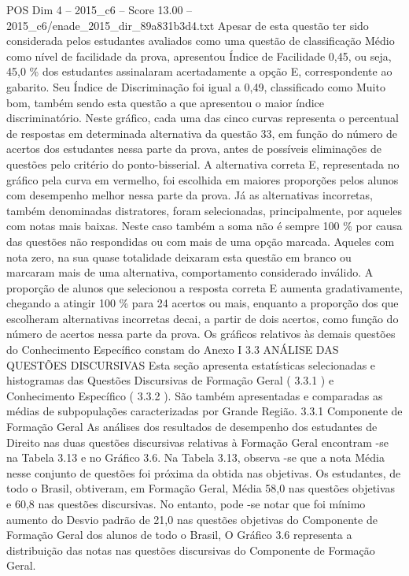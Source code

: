 \begin{textsample}{POS Dim 4 – 2015\_c6 – Score 13.00 – 2015\_c6/enade\_2015\_dir\_89a831b3d4.txt}
Apesar de esta questão ter sido considerada pelos estudantes avaliados como uma questão de classificação Médio como nível de facilidade da prova, apresentou Índice de Facilidade 0,45, ou seja, 45,0 \% dos estudantes assinalaram acertadamente a opção E, correspondente ao gabarito.
Seu Índice de Discriminação foi igual a 0,49, classificado como Muito bom, também sendo esta questão a que apresentou o maior índice discriminatório.
Neste gráfico, cada uma das cinco curvas representa o percentual de respostas em determinada alternativa da questão 33, em função do número de acertos dos estudantes nessa parte da prova, antes de possíveis eliminações de questões pelo critério do ponto-bisserial.
A alternativa correta E, representada no gráfico pela curva em vermelho, foi escolhida em maiores proporções pelos alunos com desempenho melhor nessa parte da prova.
Já as alternativas incorretas, também denominadas distratores, foram selecionadas, principalmente, por aqueles com notas mais baixas.
Neste caso também a soma não é sempre 100 \% por causa das questões não respondidas ou com mais de uma opção marcada.
Aqueles com nota zero, na sua quase totalidade deixaram esta questão em branco ou marcaram mais de uma alternativa, comportamento considerado inválido.
A proporção de alunos que selecionou a resposta correta E aumenta gradativamente, chegando a atingir 100 \% para 24 acertos ou mais, enquanto a proporção dos que escolheram alternativas incorretas decai, a partir de dois acertos, como função do número de acertos nessa parte da prova.
Os gráficos relativos às demais questões do Conhecimento Específico constam do Anexo I 3.3 ANÁLISE DAS QUESTÕES DISCURSIVAS Esta seção apresenta estatísticas selecionadas e histogramas das Questões Discursivas de Formação Geral ( 3.3.1 ) e Conhecimento Específico ( 3.3.2 ).
São também apresentadas e comparadas as médias de subpopulações caracterizadas por Grande Região. 3.3.1 Componente de Formação Geral As análises dos resultados de desempenho dos estudantes de Direito nas duas questões discursivas relativas à Formação Geral encontram -se na Tabela 3.13 e no Gráfico 3.6.
Na Tabela 3.13, observa -se que a nota Média nesse conjunto de questões foi próxima da obtida nas objetivas.
Os estudantes, de todo o Brasil, obtiveram, em Formação Geral, Média 58,0 nas questões objetivas e 60,8 nas questões discursivas.
No entanto, pode -se notar que foi mínimo aumento do Desvio padrão de 21,0 nas questões objetivas do Componente de Formação Geral dos alunos de todo o Brasil, O Gráfico 3.6 representa a distribuição das notas nas questões discursivas do Componente de Formação Geral.

\end{textsample}
